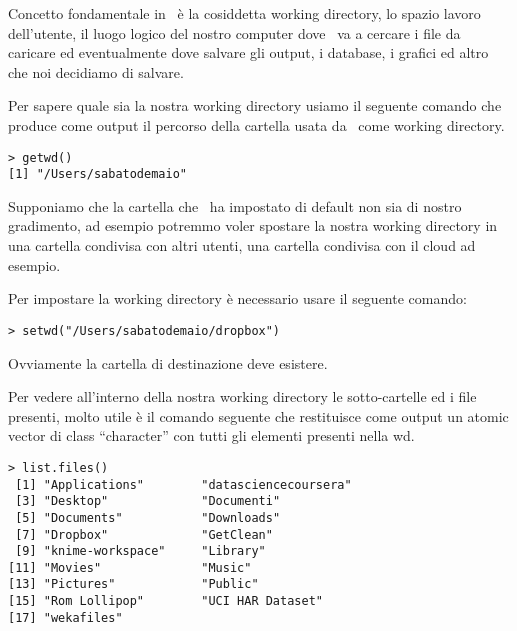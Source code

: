 Concetto fondamentale in \erre\ è la cosiddetta working directory, lo spazio lavoro dell'utente, il luogo logico del nostro computer dove \erre\ va a cercare i file da caricare ed eventualmente dove salvare gli output, i database, i grafici ed altro che noi decidiamo di salvare.

Per sapere quale sia la nostra working directory usiamo il seguente comando che produce come output il percorso della cartella usata da \erre\ come working directory.

\begin{lstlisting}
> getwd()
[1] "/Users/sabatodemaio"
\end{lstlisting}

Supponiamo che la cartella che \erre\ ha impostato di default non sia di nostro gradimento, ad esempio potremmo voler spostare la nostra working directory in una cartella condivisa con altri utenti, una cartella condivisa con il cloud ad esempio.

Per impostare la working directory è necessario usare il seguente comando:

\begin{lstlisting}
> setwd("/Users/sabatodemaio/dropbox")
\end{lstlisting}

Ovviamente la cartella di destinazione deve esistere.

Per vedere all'interno della nostra working directory le sotto-cartelle ed i file presenti, molto utile è il comando seguente che restituisce come output un atomic vector di class ``character'' con tutti gli elementi presenti nella wd.

\begin{lstlisting}
> list.files()
 [1] "Applications"        "datasciencecoursera"
 [3] "Desktop"             "Documenti"          
 [5] "Documents"           "Downloads"          
 [7] "Dropbox"             "GetClean"           
 [9] "knime-workspace"     "Library"            
[11] "Movies"              "Music"              
[13] "Pictures"            "Public"             
[15] "Rom Lollipop"        "UCI HAR Dataset"    
[17] "wekafiles"          
\end{lstlisting}


